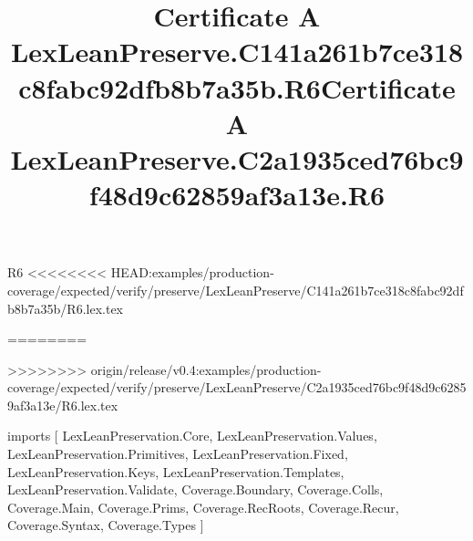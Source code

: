 \begin{lexlean}{R6}
<<<<<<<< HEAD:examples/production-coverage/expected/verify/preserve/LexLeanPreserve/C141a261b7ce318c8fabc92dfb8b7a35b/R6.lex.tex
\title{Certificate A LexLeanPreserve.C141a261b7ce318c8fabc92dfb8b7a35b.R6}
========
\title{Certificate A LexLeanPreserve.C2a1935ced76bc9f48d9c62859af3a13e.R6}
>>>>>>>> origin/release/v0.4:examples/production-coverage/expected/verify/preserve/LexLeanPreserve/C2a1935ced76bc9f48d9c62859af3a13e/R6.lex.tex
\begin{coremodule}
imports [
  LexLeanPreservation.Core,
  LexLeanPreservation.Values,
  LexLeanPreservation.Primitives,
  LexLeanPreservation.Fixed,
  LexLeanPreservation.Keys,
  LexLeanPreservation.Templates,
  LexLeanPreservation.Validate,
  Coverage.Boundary,
  Coverage.Colls,
  Coverage.Main,
  Coverage.Prims,
  Coverage.RecRoots,
  Coverage.Recur,
  Coverage.Syntax,
  Coverage.Types
]


\end{coremodule}
\end{lexlean}
